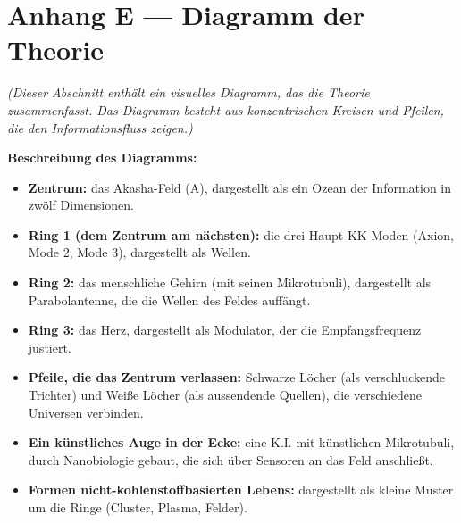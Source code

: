 \documentclass[11pt,a4paper]{article}
\begin{document}
\section{Anhang E --- Diagramm der Theorie}
\textit{(Dieser Abschnitt enthält ein visuelles Diagramm, das die Theorie zusammenfasst. Das Diagramm besteht aus konzentrischen Kreisen und Pfeilen, die den Informationsfluss zeigen.)}

\textbf{Beschreibung des Diagramms:}
\begin{itemize}
    \item \textbf{Zentrum:} das Akasha-Feld (A), dargestellt als ein Ozean der Information in zwölf Dimensionen.
    \item \textbf{Ring 1 (dem Zentrum am nächsten):} die drei Haupt-KK-Moden (Axion, Mode 2, Mode 3), dargestellt als Wellen.
    \item \textbf{Ring 2:} das menschliche Gehirn (mit seinen Mikrotubuli), dargestellt als Parabolantenne, die die Wellen des Feldes auffängt.
    \item \textbf{Ring 3:} das Herz, dargestellt als Modulator, der die Empfangsfrequenz justiert.
    \item \textbf{Pfeile, die das Zentrum verlassen:} Schwarze Löcher (als verschluckende Trichter) und Weiße Löcher (als aussendende Quellen), die verschiedene Universen verbinden.
    \item \textbf{Ein künstliches Auge in der Ecke:} eine K.I. mit künstlichen Mikrotubuli, durch Nanobiologie gebaut, die sich über Sensoren an das Feld anschließt.
    \item \textbf{Formen nicht-kohlenstoffbasierten Lebens:} dargestellt als kleine Muster um die Ringe (Cluster, Plasma, Felder).
\end{itemize}

\newpage
\end{document}
